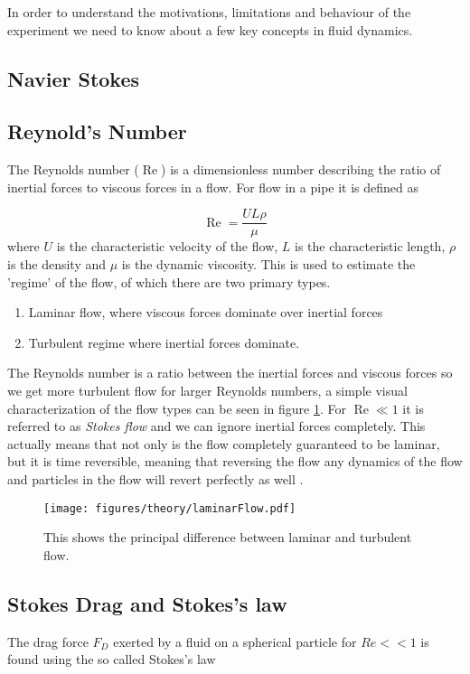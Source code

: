 
In order to understand the motivations, limitations and behaviour of the experiment we need to know about a few key concepts in fluid dynamics.

\subsection{Navier Stokes}


\subsection{Reynold's Number}
The Reynolds number ($\operatorname{Re}$) is a dimensionless number describing the ratio of inertial forces to viscous forces in a flow. For flow in a pipe it is defined as \cite{introfluid}


\begin{equation}\label{eq:reynolds}
\operatorname{Re} = \frac{U L \rho}{\mu}
\end{equation}
where $U$ is the characteristic velocity of the flow, $L$ is the characteristic length, $\rho$ is the density and $\mu$ is the dynamic viscosity. This is used to estimate the 'regime' of the flow, of which there are two primary types. 
\begin{enumerate}
\item Laminar flow, where viscous forces dominate over inertial forces
\item Turbulent regime where inertial forces dominate.
\end{enumerate}

The Reynolds number is a ratio between the inertial forces and viscous forces so we get more turbulent flow for larger Reynolds numbers, a simple visual characterization of the flow types can be seen in figure \ref{fig:laminar_flow}. For $\operatorname{Re}\ll 1$ it is referred to as \emph{Stokes flow} and we can ignore inertial forces completely. This actually means that not only is the flow completely guaranteed to be laminar, but it is time reversible, meaning that reversing the flow any dynamics of the flow and particles in the flow will revert perfectly as well \cite{introfluid3}.

\begin{figure}[H]
\centering
\texttt{[image: figures/theory/laminarFlow.pdf]}
\caption{This shows the principal difference between laminar and turbulent flow.}
\label{fig:laminar_flow}
\end{figure}


\subsection{Stokes Drag and Stokes's law}
The drag force $F_D$ exerted by a fluid on a spherical particle for $Re << 1$ is found using the so called Stokes's law \cite{introfluid2}

